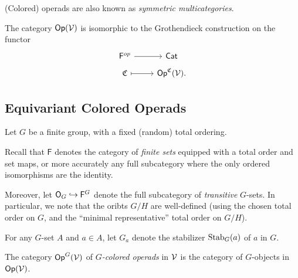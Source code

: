 \documentclass[a4paper,10pt
,draft
]{article}%
\renewcommand{\1}{\ensuremath{\mathbb{id}}}
\begin{document}
\begin{remark}
      (Colored) operads are also known as \textit{symmetric multicategories}.
\end{remark}

\begin{remark}
      The category $\mathsf{Op}(\mathcal V)$ is isomorphic to the Grothendieck construction on the functor
      \begin{equation}
            \begin{tikzcd}[row sep = tiny]
                  \mathsf F^{op} \arrow[r] & \mathsf{Cat}
                  \\
                  \mathfrak C \arrow[r, mapsto] & \Op^{\mathfrak C}(\V).
            \end{tikzcd}
      \end{equation}
\end{remark}




\subsection{Equivariant Colored Operads}

Let $G$ be a finite group, with a fixed (random) total ordering.
\begin{notation}
      [{cf. \cite{BP17}}]
      Recall that $\mathsf F$ denotes the category of \textit{finite sets} equipped with a total order and set maps,
      or more accurately any full subcategory where the only ordered isomorphisms are the identity.
      
      Moreover, let $\mathsf O_G \hookrightarrow \mathsf F^G$ denote the full subcategory of \textit{transitive} $G$-sets.
      In particular, we note that the oribts $G/H$ are well-defined (using the chosen total order on $G$,
      and the ``minimal representative'' total order on $G/H$).
\end{notation}

\begin{notation}
      For any $G$-set $A$ and $a \in A$, let $G_a$ denote the stabilizer $\mathrm{Stab}_G(a)$ of $a$ in $G$.
\end{notation}

\begin{definition}
      The category $\mathsf{Op}^G(\mathcal V)$ of  \textit{$G$-colored operads} in $\mathcal V$ is the category of
      $G$-objects in $\mathsf{Op}(\mathcal V)$.
\end{definition}
\end{document}
